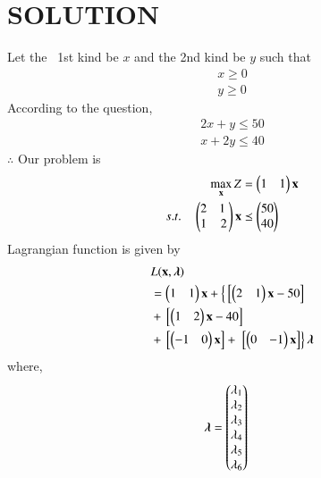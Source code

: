 \documentclass[journal,12pt,twocolumn]{IEEEtran}
\begin{document}
\section{SOLUTION} 
\begin{table}[!ht]
\centering
{}
\caption{Ingredients used in making the cake is flour and fat }
\label{tab:table1}
\end{table}
Let the  1st kind  be $x$ and the 2nd kind be $y$  such that 
\begin{align}
x \geq 0 \\
y \geq 0 
\end{align}
According to the question,
\begin{align}
2{x} + {y} \leq 50
\\
{x} + 2{y} \leq 40
\end{align}
$\therefore$ Our problem is
\begin{align}
\max_{\vec{x}} Z &= \myvec{1& 1}\vec{x}\\
s.t. \quad \myvec{2 & 1 \\ 1& 2}\vec{x} &\preceq \myvec{50\\40} 
\end{align}
Lagrangian function is given by
\begin{equation}
\begin{aligned}
&L(\mathbf{x},\boldsymbol{\lambda}) \\ &= \begin{pmatrix}1 & 1\end{pmatrix}\mathbf{x}+\left\{{}\left[\begin{pmatrix}2 & 1\end{pmatrix}\mathbf{x}-50\right]\right. \\ &+ {}\left[\begin{pmatrix}1 & 2\end{pmatrix}\mathbf{x}-40\right]\\ &+ {}\left[\begin{pmatrix}-1 & 0\end{pmatrix}\mathbf{x}\right] +\left.{}\left[\begin{pmatrix}0 & -1\end{pmatrix}\mathbf{x}\right]\right\}\boldsymbol{\lambda}
\end{aligned}
\end{equation}
where,
\begin{align}
\boldsymbol{\lambda} &= \begin{pmatrix}\lambda_1 \\ \lambda_2 \\ \lambda_3 \\ \lambda_4 \\ \lambda_5 \\ \lambda_6\end{pmatrix}
\end{align}
\end{document}
